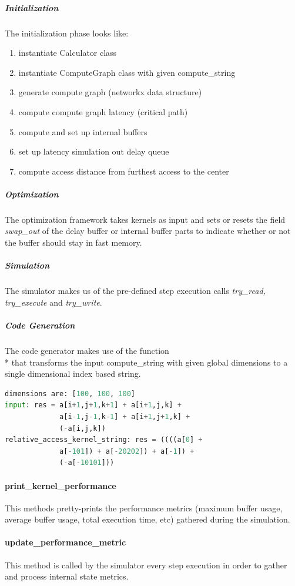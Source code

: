 \subparagraph{Initialization}
The initialization phase looks like:
\begin{enumerate}
	\item instantiate Calculator class
	\item instantiate ComputeGraph class with given compute\_string
	\item generate compute graph (networkx data structure)
	\item compute compute graph latency (critical path)
	\item compute and set up internal buffers
	\item set up latency simulation out delay queue
	\item compute access distance from furthest access to the center
\end{enumerate}


\subparagraph{Optimization}
The optimization framework takes kernels as input and sets or resets the field \textit{swap\_out} of the delay buffer or internal buffer parts to indicate whether or not the buffer should stay in fast memory.


\subparagraph{Simulation}
The simulator makes us of the pre-defined step execution calls \textit{try\_read, try\_execute} and \textit{try\_write}. 


\subparagraph{Code Generation}
The code generator makes use of the function \\*
 that transforms the input compute\_string with given global dimensions to a single dimensional index based string.
\begin{lstlisting}[showstringspaces=false, frame=single, language=Python]
dimensions are: [100, 100, 100]
input: res = a[i+1,j+1,k+1] + a[i+1,j,k] + 
             a[i-1,j-1,k-1] + a[i+1,j+1,k] + 
             (-a[i,j,k])
relative_access_kernel_string: res = ((((a[0] +
             a[-101]) + a[-20202]) + a[-1]) + 
             (-a[-10101]))
\end{lstlisting}



\paragraph{print\_kernel\_performance}
This methods pretty-prints the performance metrics (maximum buffer usage, average buffer usage, total execution time, etc) gathered during the simulation. 


\paragraph{update\_performance\_metric}
This method is called by the simulator every step execution in order to gather and process internal state metrics.


